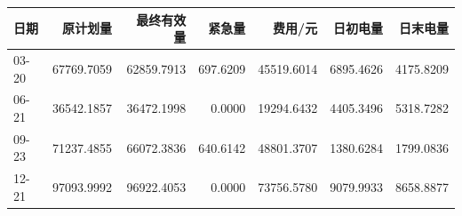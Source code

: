 \begin{tabular}{lrrrrrr}
\toprule
日期 & 原计划量 & 最终有效量 & 紧急量 & 费用/元 & 日初电量 & 日末电量 \\
\midrule
03-20 & 67769.7059 & 62859.7913 & 697.6209 & 45519.6014 & 6895.4626 & 4175.8209 \\
06-21 & 36542.1857 & 36472.1998 & 0.0000 & 19294.6432 & 4405.3496 & 5318.7282 \\
09-23 & 71237.4855 & 66072.3836 & 640.6142 & 48801.3707 & 1380.6284 & 1799.0836 \\
12-21 & 97093.9992 & 96922.4053 & 0.0000 & 73756.5780 & 9079.9933 & 8658.8877 \\
\bottomrule
\end{tabular}
